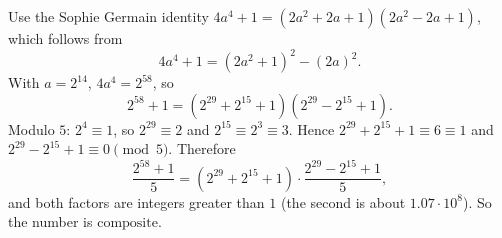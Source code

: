 Use the Sophie Germain identity $4a^4+1=(2a^2+2a+1)(2a^2-2a+1)$, which follows from
\[
4a^4+1=(2a^2+1)^2-(2a)^2 .
\]
With $a=2^{14}$, $4a^4=2^{58}$, so
\[
2^{58}+1=\left(2^{29}+2^{15}+1\right)\left(2^{29}-2^{15}+1\right).
\]
Modulo $5$: $2^4\equiv1$, so $2^{29}\equiv2$ and $2^{15}\equiv2^3\equiv3$. Hence $2^{29}+2^{15}+1\equiv6\equiv1$ and $2^{29}-2^{15}+1\equiv0\pmod5$. Therefore
\[
\dfrac{2^{58}+1}{5}=\left(2^{29}+2^{15}+1\right)\cdot\dfrac{2^{29}-2^{15}+1}{5},
\]
and both factors are integers greater than $1$ (the second is about $1.07\cdot10^8$). So the number is $\boxed{\text{composite}}$.
